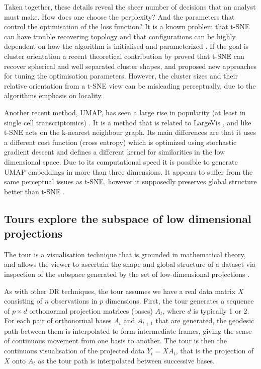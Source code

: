 \documentclass[article,notitle]{jdssv}
\begin{document}
Taken together, these details reveal the sheer number of decisions that an
analyst must make. How does one choose the perplexity? And the
parameters that control the optimisation of the loss function?
It is a known problem that
t-SNE can have trouble recovering topology and that configurations can be
highly dependent on how the algorithm is initialised and parameterized
\citep{Wattenberg2016-ji, Kobak2019-lm, Melville2020}. If the goal is cluster
orientation a recent theoretical contribution by \citet{Linderman2019-dq} proved that
t-SNE can recover spherical and well separated cluster shapes, and proposed new
approaches for tuning the optimisation parameters. However, the cluster sizes
and their relative orientation from a t-SNE view can be misleading
perceptually, due to the algorithms emphasis on locality.

Another recent method, UMAP, has seen a large rise in popularity (at least in
single cell transcriptomics) \citep{McInnes2018-co}. It is a method that is related to
LargeVis \citep{Tang2016-oz}, and like t-SNE acts on the k-nearest neighbour graph.
Its main differences are that it uses a different cost function (cross entropy)
which is optimized using stochastic gradient descent and defines a different
kernel for similarities in the low dimensional space. Due to its computational
speed it is possible to generate UMAP embeddings in more than three dimensions.
It appears to suffer from the same perceptual issues as t-SNE, however it supposedly preserves global structure better than t-SNE \citep{Coenen2019-to}.

\hypertarget{tours-explore-the-subspace-of-low-dimensional-projections}{%
\subsection{Tours explore the subspace of low dimensional projections}\label{tours-explore-the-subspace-of-low-dimensional-projections}}

The tour is a visualisation technique that is grounded in
mathematical theory, and allows the viewer to ascertain
the shape and global structure of a dataset via inspection of the subspace generated by the set of low-dimensional projections \citep{Asimov1985-vp, Buja1986-zr}.

As with other DR techniques, the tour assumes we have a real data matrix
\(X\) consisting of \(n\) observations in \(p\) dimensions. First, the tour generates
a sequence of \(p \times d\) orthonormal projection matrices (bases)
\(A_t\), where \(d\) is typically 1 or 2. For each pair of
orthonormal bases \(A_{t}\) and \(A_{t+1}\) that are generated, the geodesic
path between them is interpolated to form intermediate frames, giving the
sense of continuous movement from one basis to another. The tour is then the
continuous visualisation of the projected data \(Y_{t} = XA_{t}\), that is the
projection of \(X\) onto \(A_{t}\) as the tour path is interpolated between
successive bases.
\end{document}
